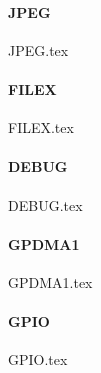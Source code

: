 \paragraph{JPEG}
{JPEG.tex}

\paragraph{FILEX}
{FILEX.tex}

\paragraph{DEBUG}
{DEBUG.tex}

\paragraph{GPDMA1}
{GPDMA1.tex}

\paragraph{GPIO}
{GPIO.tex}